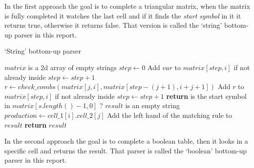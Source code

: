 In the first approach the goal is to complete a triangular matrix, when the matrix is fully completed it watches the last cell and if it finds the \textit{start symbol} in it it returns true, otherwise it returns false.
That version is called the `string' bottom-up parser in this report.

\FloatBarrier
\begin{algorithm}
    \caption{`String' bottom-up parser}
    \label{parse}
    \begin{algorithmic}[1]
         
            \State $matrix$ is a 2d array of empty strings
            \State $step \gets 0$
                            \State Add $var$ to $matrix[step, i]$ if not already inside
                        \EndIf
                    \EndFor
                \EndFor
            \EndFor
            \State $step \gets step + 1$
                        \State $r \gets check\_combs(matrix[j, i], matrix[step - (j + 1), i + j + 1])$
                        \State Add $r$ to $matrix[step, i]$ if not already inside
                    \EndFor
                \EndFor
                \State $step \gets step + 1$
            \EndWhile
            \State \textbf{return} is the start symbol in $matrix[s.length() - 1, 0]$ ?
        \EndProcedure
            \State $result$ is an empty string
                    \State $production \gets cell\_1[i] . cell\_2[j]$
                        \State Add the left hand of the matching rule to $result$
                    \EndIf
                \EndFor
            \EndFor
            \State \textbf{return} $result$
        \EndProcedure
    \end{algorithmic}
\end{algorithm}
\FloatBarrier

In the second approach the goal is to complete a boolean table, then it looks in a specific cell and returns the result.
That parser is called the `boolean' bottom-up parser in this report.

